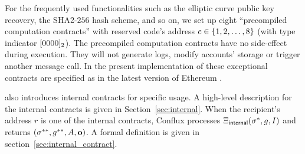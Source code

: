 For the frequently used functionalities such as the elliptic curve public key recovery, the SHA2-$256$ hash scheme, and so on, we set up eight ``precompiled computation contracts'' with reserved code's address $c\in{\left \{{1,2,\dots,8} \right \}}$ (with type indicator $[0000]_2$). The precompiled computation contracts have no side-effect during execution. They will not generate logs, modify accounts' storage or trigger another message call. 
%
In the present implementation of \name these exceptional contracts are specified as in the latest version of Ethereum \cite{ETH_yellow}.

\name also introduces internal contracts for specific usage. A high-level description for the internal contracts is given in Section~\ref{sec:internal}. When the recipient's address $r$ is one of the internal contracts, Conflux processes $\mathrm{\Xi}_{\sf internal}(\mathbf{\sigma}^*,g,I)$ and returns $\left(\mathbf{\sigma}^{**}, g^{**},  A, \mathbf{o} \right)$. A formal definition is given in section~\ref{sec:internal_contract}. 

